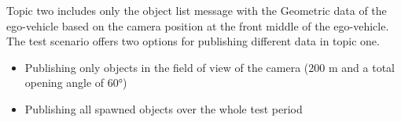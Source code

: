 Topic two includes only the object list message with the Geometric data of the ego-vehicle based on the camera position at the front middle of the ego-vehicle.
The test scenario offers two options for publishing different data in topic one.
\begin{itemize}
	\item Publishing only objects in the field of view of the camera (200 m and a total opening angle of \ang{60})
	\item Publishing all spawned objects over the whole test period
\end{itemize}